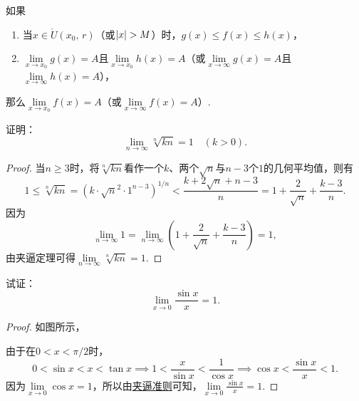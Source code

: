 \begin{corollary}
如果
\begin{enumerate}
\item 当\(x \in \mathring{U}(x_0,\,r)\)（或\(\abs{x} > M\)）时，\(g(x) \leq f(x) \leq h(x)\)，
\item \(\lim\limits_{x \to x_0} g(x) = A\)且\(\lim\limits_{x \to x_0} h(x) = A\)（或\(\lim\limits_{x \to \infty} g(x) = A\)且\(\lim\limits_{x \to \infty} h(x) = A\)），
\end{enumerate}
那么\(\lim\limits_{x \to x_0} f(x) = A\)（或\(\lim\limits_{x \to \infty} f(x) = A\)）.
\end{corollary}

\begin{example}
证明：\begin{equation}
	\lim\limits_{n\to\infty} \sqrt[n]{k n} = 1
	\quad(k>0).
\end{equation}
\begin{proof}
当\(n \geq 3\)时，将\(\sqrt[n]{k n}\)看作一个\(k\)、两个\(\sqrt{n}\)与\(n-3\)个\(1\)的几何平均值，则有\[
1 \leq \sqrt[n]{k n} = (k \cdot \sqrt{n}^2 \cdot 1^{n-3})^{1/n}
< \frac{k + 2\sqrt{n} + n-3}{n}
= 1 + \frac{2}{\sqrt{n}} + \frac{k-3}{n}.
\]因为\[
\lim\limits_{n\to\infty} 1
= \lim\limits_{n\to\infty} \left(1 + \frac{2}{\sqrt{n}} + \frac{k-3}{n}\right) = 1,
\]由夹逼定理可得\(\lim\limits_{n\to\infty} \sqrt[n]{k n} = 1\).
\end{proof}
\end{example}

\begin{example}[重要极限I]
试证：\begin{equation}\label{equation:极限.重要极限I}
\lim\limits_{x\to0} \frac{\sin x}{x} = 1.
\end{equation}
\begin{proof}
如图所示，
\begin{center}
\end{center}
由于在\(0 < x < \pi/2\)时，\[
0 < \sin x < x < \tan x
\implies
1 < \frac{x}{\sin x} < \frac{1}{\cos x}
\implies
\cos x < \frac{\sin x}{x} < 1.
\]
因为\(\lim\limits_{x\to0}\cos x = 1\)，所以由\hyperref[theorem:极限.夹逼准则]{夹逼准则}可知，\(\lim\limits_{x\to0} \frac{\sin x}{x} = 1\).
\end{proof}
\end{example}

